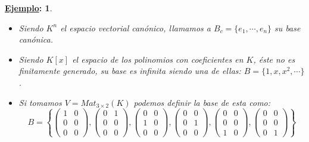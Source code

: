 \documentclass[10pt,a4paper,openright]{book}
\theoremstyle{break}
\newtheorem*{ej}{\underline{Ejemplo}:}
\begin{document}
\begin{ej}
\begin{itemize}
\item Siendo $K^n$ el espacio vectorial canónico, llamamos a $B_c=\{e_1, \cdots, e_n\}$ su base canónica.

\item Siendo $K[x]$ el espacio de los polinomios con coeficientes en $K$, éste no es finitamente generado, su base es infinita siendo una de ellas: $B=\{1, x, x^2, \cdots\}$. 

\item Si tomamos $V = Mat_{3\times 2}(K)$ podemos definir la base de esta como:
$$B=\left\lbrace\left(\begin{array}{cc}1 & 0 \\ 0 & 0 \\ 0 & 0 \end{array}\right), \left(\begin{array}{cc}0 & 1 \\ 0 & 0 \\ 0 & 0 \end{array}\right), \left(\begin{array}{cc}0 & 0 \\ 1 & 0 \\ 0 & 0 \end{array}\right), \left(\begin{array}{cc}0 & 0 \\ 0 & 1 \\ 0 & 0 \end{array}\right), \left(\begin{array}{cc}0 & 0 \\ 0 & 0 \\ 1 & 0 \end{array}\right), \left(\begin{array}{cc}0 & 0 \\ 0 & 0 \\ 0 & 1 \end{array}\right)\right\rbrace$$
\end{itemize}
\end{ej}
\end{document}
